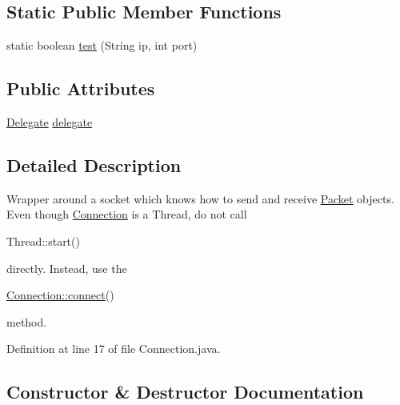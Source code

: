 \subsection*{Static Public Member Functions}
\begin{DoxyCompactItemize}
\item 
static boolean \hyperlink{classpt_1_1up_1_1fe_1_1lpro1613_1_1sharedlib_1_1conn_1_1_connection_a9431e4e6dd9b16f463bd75079bd8c371}{test} (String ip, int port)
\end{DoxyCompactItemize}
\subsection*{Public Attributes}
\begin{DoxyCompactItemize}
\item 
\hyperlink{interfacept_1_1up_1_1fe_1_1lpro1613_1_1sharedlib_1_1conn_1_1_connection_1_1_delegate}{Delegate} \hyperlink{classpt_1_1up_1_1fe_1_1lpro1613_1_1sharedlib_1_1conn_1_1_connection_ad0181759fff34ee0320a29111462ef94}{delegate}
\end{DoxyCompactItemize}


\subsection{Detailed Description}
Wrapper around a socket which knows how to send and receive \hyperlink{classpt_1_1up_1_1fe_1_1lpro1613_1_1sharedlib_1_1conn_1_1_packet}{Packet} objects. Even though \hyperlink{classpt_1_1up_1_1fe_1_1lpro1613_1_1sharedlib_1_1conn_1_1_connection}{Connection} is a Thread, do not call
\begin{DoxyCode}
Thread::start() 
\end{DoxyCode}
 directly. Instead, use the
\begin{DoxyCode}
\hyperlink{classpt_1_1up_1_1fe_1_1lpro1613_1_1sharedlib_1_1conn_1_1_connection_a8ccfed3defecf3a4070c32a0f3d6acb7}{Connection::connect}() 
\end{DoxyCode}
 method. 

Definition at line 17 of file Connection.\+java.



\subsection{Constructor \& Destructor Documentation}
\hypertarget{classpt_1_1up_1_1fe_1_1lpro1613_1_1sharedlib_1_1conn_1_1_connection_ad3c3b594a0c16b3b95f504039700a876}{}\label{classpt_1_1up_1_1fe_1_1lpro1613_1_1sharedlib_1_1conn_1_1_connection_ad3c3b594a0c16b3b95f504039700a876} 
